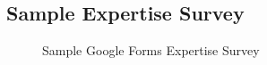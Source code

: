 \subsection{Sample Expertise Survey}

\begin{figure}
    \centerline{
      \hfil
       }
    \caption{Sample Google Forms Expertise Survey} \label{fig:sampleSurvey}
\end{figure}











